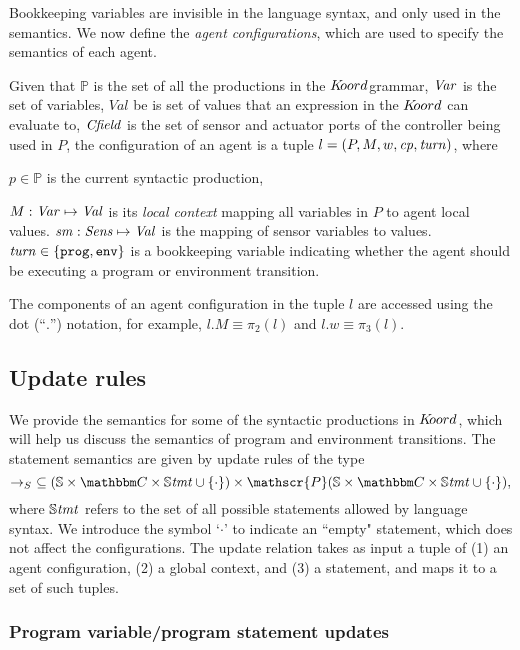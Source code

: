 Bookkeeping variables are invisible in the language syntax, and only used in the semantics. We now define the \emph{agent configurations}, which are used to specify the semantics of each agent. \newline


Given that $\mathbb{P}$ is the set of all the productions in the $K\kern-2pt oord$grammar, $\mathit{Var}$ is the set of variables, $Val$ be is set of values that an expression in the $K\kern-2pt oord$ can evaluate to, $\mathit{Cfield}$ is the set of sensor and actuator ports of the controller being used in $P$, the configuration of an agent is a tuple $ l = (P, {M},{w},\mathit{cp},\mathit{turn})$, where\newline


 $p \in \mathbb{P}$ is the current syntactic production,\newline

 ${M} : \mathit{Var} \mapsto \mathit{Val}$ is its {\em local context\/} mapping all variables in $P$ to agent local values.
\newline
 $\mathit{sm} : \mathit{Sens} \mapsto \mathit{Val}$ is the mapping of sensor variables to values.
\newline
 $\mathit{turn} \in \{\mathtt{prog,env}\}$ is a bookkeeping variable indicating whether the agent should be executing a program or environment transition. 

The components of an agent configuration in the tuple $l$ are accessed
using the dot (``$.$'') notation, for example, $l.M\equiv
\pi_2(l)$ and $l.w \equiv \pi_3(l)$.
\subsection{Update rules}
We provide the semantics for some of the syntactic productions in $K\kern-2pt oord$, which will help us discuss the semantics of program and environment transitions. The statement semantics are given by update rules of the type
$$\stmtrule\ \subseteq (\pws \times \pwl\times \pwstmt \cup \{\cdot\}) \times \mathscr{P}(\pws\times \pwl \times \pwstmt \cup \{\cdot\}),$$
where $\mathbb{S\mathit{tmt}}$ refers to the set of all possible statements allowed by language syntax. We introduce the symbol `$\cdot$' to indicate an ``empty" statement, which does not affect the configurations. The update relation takes as input a tuple of (1) an agent configuration, (2) a global context, and (3) a statement, and maps it to a set of such tuples. 
\subsubsection{Program variable/program statement updates}

